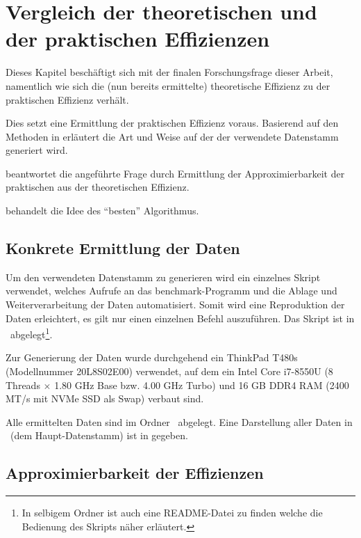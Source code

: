 \chapter{Vergleich der theoretischen und der praktischen Effizienzen}
\label{cha:vergleich}

Dieses Kapitel beschäftigt sich mit der finalen Forschungsfrage dieser Arbeit, namentlich wie sich die (nun bereits ermittelte) theoretische Effizienz zu der praktischen Effizienz verhält.

Dies setzt eine Ermittlung der praktischen Effizienz voraus. Basierend auf den Methoden in  erläutert  die Art und Weise auf der der verwendete Datenstamm generiert wird.

 beantwortet die angeführte Frage durch Ermittlung der Approximierbarkeit der praktischen aus der theoretischen Effizienz.

 behandelt die Idee des \enquote{besten} Algorithmus. 

\section{Konkrete Ermittlung der Daten}
\label{sec:data-generation}

Um den verwendeten Datenstamm zu generieren wird ein einzelnes Skript verwendet, welches Aufrufe an das benchmark-Programm und die Ablage und Weiterverarbeitung der Daten automatisiert. Somit wird eine Reproduktion der Daten erleichtert, es gilt nur einen einzelnen Befehl auszuführen. Das Skript ist in \crScriptsGenerate\ abgelegt\footnote{In selbigem Ordner ist auch eine README-Datei zu finden welche die Bedienung des Skripts näher erläutert.}.

Zur Generierung der Daten wurde durchgehend ein ThinkPad T480s (Modellnummer 20L8S02E00) verwendet, auf dem ein Intel Core i7-8550U (8 Threads $\times$ 1.80 GHz Base bzw. 4.00 GHz Turbo) und 16 GB DDR4 RAM (2400 MT/s mit NVMe SSD als Swap) verbaut sind.

Alle ermittelten Daten sind im Ordner \crData\ abgelegt. Eine Darstellung aller Daten in \crDataCanon\ (dem Haupt-Datenstamm) ist in  gegeben.

\section{Approximierbarkeit der Effizienzen}
\label{sec:approximation}

